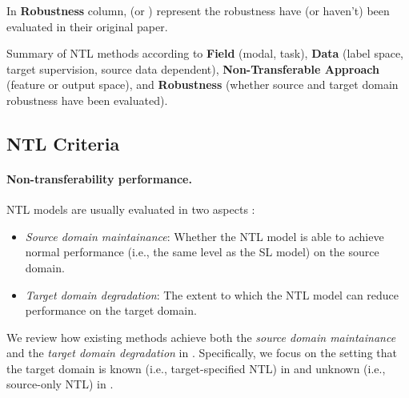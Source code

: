 \begin{table*}
\begin{flushleft}
        \textbf{} In \textbf{Robustness} column, \true (or \false) represent the robustness have (or haven't) been evaluated in their original paper.
    \end{flushleft}
    \vspace{-3mm}
    \caption{Summary of NTL methods according to \textbf{Field} (modal, task), \textbf{Data} (label space, target supervision, source data dependent), \textbf{Non-Transferable Approach} (feature or output space), and \textbf{Robustness} (whether source and target domain robustness have been evaluated). 
    }
    \vspace{-1mm}
    \label{tab:summary}
  \end{table*}
  



\subsection{NTL Criteria}
\label{sec:criteria}

\paragraph{Non-transferability performance.} 
NTL models are usually evaluated in two aspects \cite{wang2021non}:
\begin{itemize}[leftmargin=*, topsep=0pt]\setlength{\parskip}{0pt}
    \item \textit{Source domain maintainance}: Whether the NTL model is able to achieve normal performance (i.e., the same level as the SL model) on the source domain.
    \item \textit{Target domain degradation}: The extent to which the NTL model can reduce performance on the target domain.
\end{itemize}
We review how existing methods achieve both the \textit{source domain maintainance} and the \textit{target domain degradation} in . Speciﬁcally, we focus on the setting that the target domain is known (i.e., target-specified NTL) in  and unknown (i.e., source-only NTL) in .


